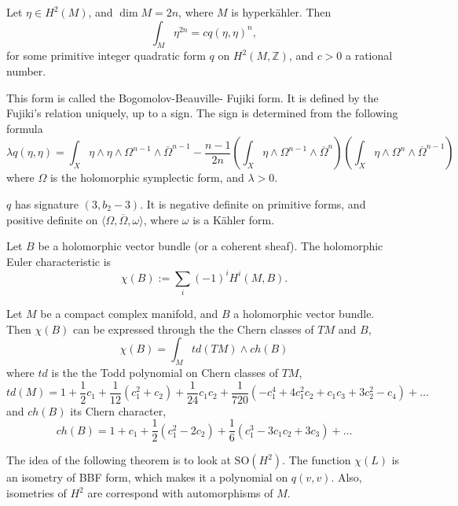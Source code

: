 \begin{theorem}[Fujiki]
\label{theorem-fujiki}
Let \(\eta \in H^2(M)\), and \(\dim M = 2n\),
where \(M\) is hyperk\"ahler. Then
\[
\int_M \eta^{2n} = cq(\eta,\eta)^n,
\]
for some primitive integer quadratic form
\(q\) on \(H^2(M,\mathbb{Z})\), and
\(c>0\) a rational number.
\end{theorem}

\begin{definition}
\label{definition-bbf-form}
This form is called the Bogomolov-Beauville-
Fujiki form. It is defined by the Fujiki's
relation uniquely, up to a sign. The sign is
determined from the following formula
\[
\lambda q(\eta,\eta)=
\int_X \eta \wedge \eta \wedge \Omega^{n-1}
\wedge \overline{\Omega}^{n-1}
- \frac{n-1}{2n}
\left(
\int_X \eta \wedge \Omega^{n-1}
\wedge \overline{\Omega}^{n}
\right)
\left(
\int_X \eta \wedge \Omega^{n}
\wedge \overline{\Omega}^{n-1}
\right)
\]
where \(\Omega\) is the holomorphic symplectic
form, and \(\lambda>0\).
\end{definition}

\begin{remark}
\label{remark-bbf-signature}
\(q\) has signature \((3,b_2-3)\). It is
negative definite on primitive forms, and
positive definite on \(\langle \Omega,
\overline{\Omega}, \omega \rangle\), where
\(\omega\) is a K\"ahler form.
\end{remark}

\begin{definition}
\label{definition-holomorphic-euler}
Let \(B\) be a holomorphic vector bundle (or
a coherent sheaf). The holomorphic Euler
characteristic is
\[
\chi(B) := \sum_i (-1)^i H^i(M,B).
\]
\end{definition}

\begin{theorem}
\label{theorem-rriemann-roch-hirzebruch}
Let \(M\) be a compact complex manifold, and
\(B\) a holomorphic vector bundle. Then
\(\chi(B)\) can be expressed through the
the Chern classes of \(TM\) and \(B\),
\[
\chi(B)=\int_M td(TM)\wedge ch(B)
\]
where \(td\) is the the Todd polynomial on
Chern classes of \(TM\),
\[
td(M)=1+\frac{1}{2}c_1+\frac{1}{12}(c_1^2+c_2)
+\frac{1}{24}c_1c_2+\frac{1}{720}
(-c_1^4+4c_1^2c_2+c_1c_3+3c_2^2-c_4)+\ldots
\]
and \(ch(B)\) its Chern character,
\[
ch(B)=1+c_1+\frac{1}{2}(c_1^2-2c_2)
+\frac{1}{6}(c_1^3-3c_1c_2+3c_3)+\ldots
\]
\end{theorem}

\noindent
The idea of the following theorem
is to look at $\text{SO}(H^2)$.
The function $\chi(L)$ is an isometry
of BBF form, which makes it a polynomial
on $q(v,v)$. Also, isometries of $H^2$
are correspond with automorphisms of $M$.

